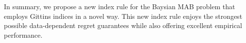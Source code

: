 In summary, we propose a new index rule for the Baysian MAB problem that employs Gittins indices in a novel way. This new index rule enjoys the strongest possible data-dependent regret guarantees while also offering excellent empirical performance. 




